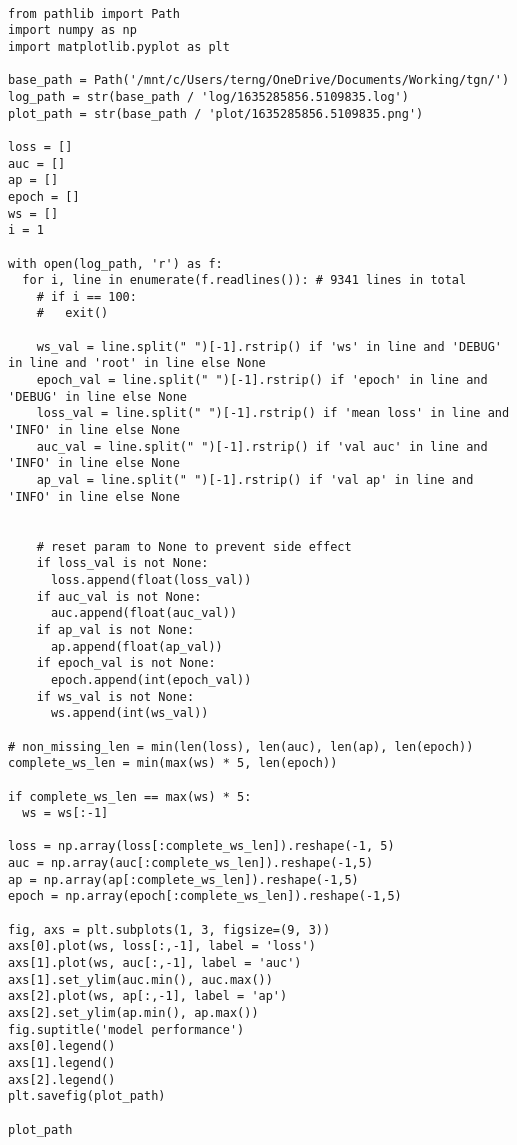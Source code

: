 \documentclass[11pt]{article}
\begin{document}
\begin{verbatim}

from pathlib import Path
import numpy as np
import matplotlib.pyplot as plt

base_path = Path('/mnt/c/Users/terng/OneDrive/Documents/Working/tgn/')
log_path = str(base_path / 'log/1635285856.5109835.log')
plot_path = str(base_path / 'plot/1635285856.5109835.png')

loss = []
auc = []
ap = []
epoch = []
ws = []
i = 1

with open(log_path, 'r') as f:
  for i, line in enumerate(f.readlines()): # 9341 lines in total
    # if i == 100:
    #   exit()

    ws_val = line.split(" ")[-1].rstrip() if 'ws' in line and 'DEBUG' in line and 'root' in line else None
    epoch_val = line.split(" ")[-1].rstrip() if 'epoch' in line and 'DEBUG' in line else None
    loss_val = line.split(" ")[-1].rstrip() if 'mean loss' in line and 'INFO' in line else None
    auc_val = line.split(" ")[-1].rstrip() if 'val auc' in line and 'INFO' in line else None
    ap_val = line.split(" ")[-1].rstrip() if 'val ap' in line and 'INFO' in line else None


    # reset param to None to prevent side effect
    if loss_val is not None:
      loss.append(float(loss_val))
    if auc_val is not None:
      auc.append(float(auc_val))
    if ap_val is not None:
      ap.append(float(ap_val))
    if epoch_val is not None:
      epoch.append(int(epoch_val))
    if ws_val is not None:
      ws.append(int(ws_val))

# non_missing_len = min(len(loss), len(auc), len(ap), len(epoch))
complete_ws_len = min(max(ws) * 5, len(epoch))

if complete_ws_len == max(ws) * 5:
  ws = ws[:-1]

loss = np.array(loss[:complete_ws_len]).reshape(-1, 5)
auc = np.array(auc[:complete_ws_len]).reshape(-1,5)
ap = np.array(ap[:complete_ws_len]).reshape(-1,5)
epoch = np.array(epoch[:complete_ws_len]).reshape(-1,5)

fig, axs = plt.subplots(1, 3, figsize=(9, 3))
axs[0].plot(ws, loss[:,-1], label = 'loss')
axs[1].plot(ws, auc[:,-1], label = 'auc')
axs[1].set_ylim(auc.min(), auc.max())
axs[2].plot(ws, ap[:,-1], label = 'ap')
axs[2].set_ylim(ap.min(), ap.max())
fig.suptitle('model performance')
axs[0].legend()
axs[1].legend()
axs[2].legend()
plt.savefig(plot_path)

plot_path
\end{verbatim}
\end{document}
